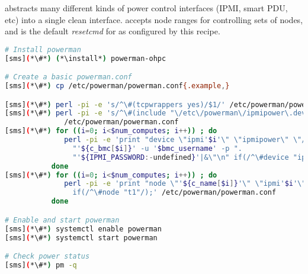 \powerman{} abstracts many different kinds of power control interfaces (IPMI, 
smart PDU, etc) into a single clean interface. \powerman{} accepts node ranges
for controlling sets of nodes, and is the default {\em resetcmd} for \conman{}
as configured by this recipe.

\begin{lstlisting}[language=bash,keywords={},upquote=true]
# Install powerman
[sms](*\#*) (*\install*) powerman-ohpc

# Create a basic powerman.conf
[sms](*\#*) cp /etc/powerman/powerman.conf{.example,}

[sms](*\#*) perl -pi -e 's/^\#(tcpwrappers yes)/$1/' /etc/powerman/powerman.conf
[sms](*\#*) perl -pi -e 's/^\#(include "\/etc\/powerman\/ipmipower\.dev")/$1/' \
              /etc/powerman/powerman.conf
[sms](*\#*) for ((i=0; i<$num_computes; i++)) ; do
              perl -pi -e 'print "device \"ipmi'$i'\" \"ipmipower\" \"/usr/sbin/ipmipower -h ".
                "'${c_bmc[$i]}' -u '$bmc_username' -p ".
                "'${IPMI_PASSWORD:-undefined}'|&\"\n" if(/^\#device "ipmi1"/);' /etc/powerman/powerman.conf
           done
[sms](*\#*) for ((i=0; i<$num_computes; i++)) ; do
              perl -pi -e 'print "node \"'${c_name[$i]}'\" \"ipmi'$i'\" \"'${c_bmc[$i]}'\"\n"
                if(/^\#node "t1"/);' /etc/powerman/powerman.conf
           done

# Enable and start powerman
[sms](*\#*) systemctl enable powerman
[sms](*\#*) systemctl start powerman

# Check power status
[sms](*\#*) pm -q
\end{lstlisting}

